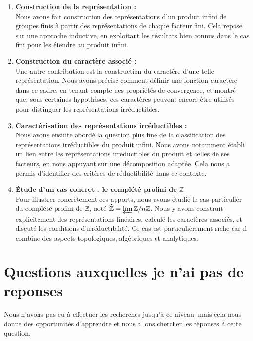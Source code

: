 \documentclass[a4paper, 14pt]{report}
\begin{document}
\begin{enumerate}
	\item \textbf{Construction de la représentation :} \\
Nous avons fait construction des représentations d’un produit infini de groupes finis à partir des représentations de chaque facteur fini. Cela repose sur une approche inductive, en exploitant les résultats bien connus dans le cas fini pour les étendre au produit infini.
	
	\item \textbf{Construction du caractère associé :} \\
	Une autre contribution est la construction du caractère d’une telle représentation. Nous avons précisé comment définir une fonction caractère dans ce cadre, en tenant compte des propriétés de convergence, et montré que, sous certaines hypothèses, ces caractères peuvent encore être utilisés pour distinguer les représentations irréductibles.
	
	\item \textbf{Caractérisation des représentations irréductibles :} \\
	Nous avons ensuite abordé la question plus fine de la classification des représentations irréductibles du produit infini. Nous avons notamment établi un lien entre les représentations irréductibles du produit et celles de ses facteurs, en nous appuyant sur une décomposition adaptée. Cela nous a permis d’identifier des critères de réductibilité dans ce contexte.
	
	\item \textbf{Étude d’un cas concret : le complété profini de \( \mathbb{Z} \)} \\
	Pour illustrer concrètement ces apports, nous avons étudié le cas particulier du complété profini de \( \mathbb{Z} \), noté \( \widehat{\mathbb{Z}} = \varprojlim \mathbb{Z}/n\mathbb{Z} \). Nous y avons construit explicitement des représentations linéaires, calculé les caractères associés, et discuté les conditions d’irréductibilité. Ce cas est particulièrement riche car il combine des aspects topologiques, algébriques et analytiques.
\end{enumerate}


\section{Questions auxquelles je n'ai pas de reponses}
Nous n'avons pas eu à effectuer les recherches jusqu'à ce niveau, mais cela nous donne des opportunités d'apprendre et nous allons chercher les réponses à cette question.
\end{document}
